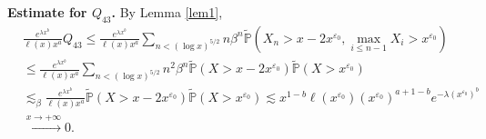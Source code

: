 \documentclass[11pt]{article}
\numberwithin{equation}{section}
\begin{document}
\noindent
{\bf Estimate for $Q_{43}$.}  By Lemma \ref{lem1}, 
\begin{align}\label{e35-1}
	& \frac{e^{\lambda x^b}}{\ell(x)x^a } Q_{43}  \leq \frac{e^{\lambda x^b}}{\ell(x)x^a }  \sum_{n< (\log x)^{5/2}} n \beta^{n}  \widetilde{\mathbb{P}}\left(   X_n > x-2x^{\varepsilon_0}, \max_{i\leq n-1} X_i > x^{\varepsilon_0}\right) \nonumber\\
	&\leq \frac{e^{\lambda x^b}}{\ell(x)x^a }  \sum_{n< (\log x)^{5/2}} n^2 \beta^{n}  \widetilde{\mathbb{P}}\left(   X > x-2x^{\varepsilon_0} \right) \widetilde{\mathbb{P}}\left(   X > x^{\varepsilon_0}\right) \nonumber\\
	&\lesssim_\beta  \frac{e^{\lambda x^b}}{\ell(x)x^a }  \widetilde{\mathbb{P}}\left(   X > x-2x^{\varepsilon_0} \right) \widetilde{\mathbb{P}}\left(   X > x^{\varepsilon_0}\right) \lesssim  x^{1-b} \ell(x^{\varepsilon_0}) (x^{\varepsilon_0})^{a+1-b}e^{-\lambda (x^{\varepsilon_0})^b} \nonumber\\
	&\stackrel{x\to+\infty}{\longrightarrow}0.
\end{align}
\end{document}
